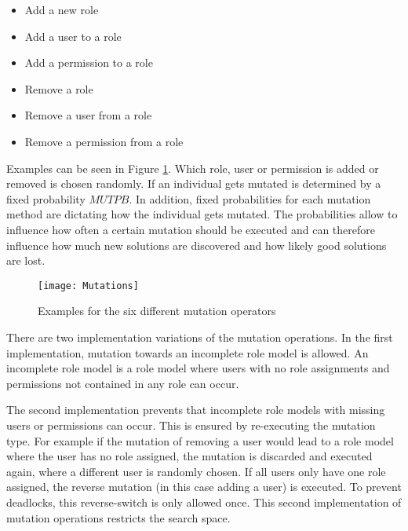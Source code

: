         \begin{itemize}
            \setlength{\itemsep}{1pt}
            \item Add a new role
            \item Add a user to a role
            \item Add a permission to a role
            \item Remove a role
            \item Remove a user from a role
            \item Remove a permission from a role
        \end{itemize}
        
        Examples can be seen in Figure \ref{fig:mutationOperations}. Which role, user or permission is added or removed is chosen randomly. If an individual gets mutated is determined by a fixed probability $MUTPB$. In addition, fixed probabilities for each mutation method are dictating how the individual gets mutated. The probabilities allow to influence how often a certain mutation should be executed and can therefore influence how much new solutions are discovered and how likely good solutions are lost. 
        
        \begin{figure}[H]
              	\centering
              	\texttt{[image: Mutations]}
              	\caption{Examples for the six different mutation operators}
              	\label{fig:mutationOperations}
        \end{figure}
                
        There are two implementation variations of the mutation operations. In the first implementation, mutation towards an incomplete role model is allowed. An incomplete role model is a role model where users with no role assignments and permissions not contained in any role can occur.
       
        The second implementation prevents that incomplete role models with missing users or permissions can occur. This is ensured by re-executing the mutation type. For example if the mutation of removing a user would lead to a role model where the user has no role assigned, the mutation is discarded and executed again, where a different user is randomly chosen. If all users only have one role assigned, the reverse mutation (in this case adding a user) is executed. To prevent deadlocks, this reverse-switch is only allowed once. This second implementation of mutation operations restricts the search space. 
        
